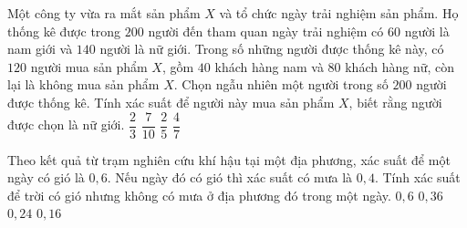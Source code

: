 \begin{ex}%
	Một công ty vừa ra mắt sản phẩm $X$ và tổ chức ngày trải nghiệm sản phẩm. Họ thống kê được trong $200$ người đến tham quan ngày trải nghiệm có $60$ người là nam giới và $140$ người là nữ giới. Trong số những người được thống kê này, có $120$ người mua sản phẩm $X$, gồm $40$ khách hàng nam và $80$ khách hàng nữ, còn lại là không mua sản phẩm $X$. Chọn ngẫu nhiên một người trong số $200$ người được thống kê. Tính xác suất để người này mua sản phẩm $X$, biết rằng người được chọn là nữ giới.
	\choice
	{$\dfrac{2}{3}$}
	{$\dfrac{7}{10}$}
	{$\dfrac{2}{5}$}
	{\True $\dfrac{4}{7}$}
\end{ex}
\begin{ex}%
	Theo kết quả từ trạm nghiên cứu khí hậu tại một địa phương, xác suất để một ngày có gió là $0{,}6$. Nếu ngày đó có gió thì xác suất có mưa là $0{,}4$. Tính xác suất để trời có gió nhưng không có mưa ở địa phương đó trong một ngày.
	\choice
	{$0{,}6$}
	{\True $0{,}36$}
	{$0{,}24$}
	{$0{,}16$}
\end{ex}
